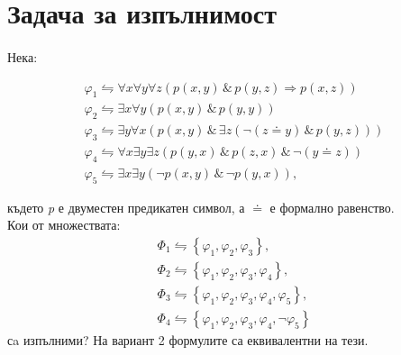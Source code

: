 \documentclass[12pt]{article}
\def\Land{\,\&\,}
\begin{document}
\newpage
\section{Задача за изпълнимост}
\paragraph{}
Нека:
\begin{addmargin}[1em]{2em}
    \begin{gather*}
        \varphi_{1}\leftrightharpoons\forall x \forall y \forall z(p(x, y)\Land p(y, z) \Rightarrow p(x, z))\\
        \varphi_{2}\leftrightharpoons\exists x \forall y(p(x, y)\Land p(y, y))\\
        \varphi_{3}\leftrightharpoons\exists y \forall x(p(x, y)\Land \exists z(\neg(z \doteq y)\Land p(y, z)))\\
        \varphi_{4}\leftrightharpoons\forall x \exists y \exists z(p(y, x)\Land p(z, x)\Land \neg(y \doteq z))\\
        \varphi_{5}\leftrightharpoons\exists x \exists y(\neg p(x, y)\Land \neg p(y, x)),
    \end{gather*}
\end{addmargin}
където \textit{p} е двуместен предикатен символ, а $\doteq$ е формално равенство.\\
\indent Кои от множествата:
\begin{gather*}
    \varPhi_1 \leftrightharpoons \left\{\varphi_{1}, \varphi_{2}, \varphi_{3}\right\},\\
    \varPhi_2 \leftrightharpoons \left\{\varphi_{1}, \varphi_{2}, \varphi_{3}, \varphi_{4}\right\},\\
    \varPhi_3 \leftrightharpoons \left\{\varphi_{1}, \varphi_{2}, \varphi_{3}, \varphi_{4}, \varphi_{5}\right\},\\
    \varPhi_4 \leftrightharpoons\left\{\varphi_{1}, \varphi_{2}, \varphi_{3}, \varphi_{4}, \neg \varphi_{5}\right\}
\end{gather*}
сa изпълними? На вариант 2 формулите са еквивалентни на тези.
\end{document}
